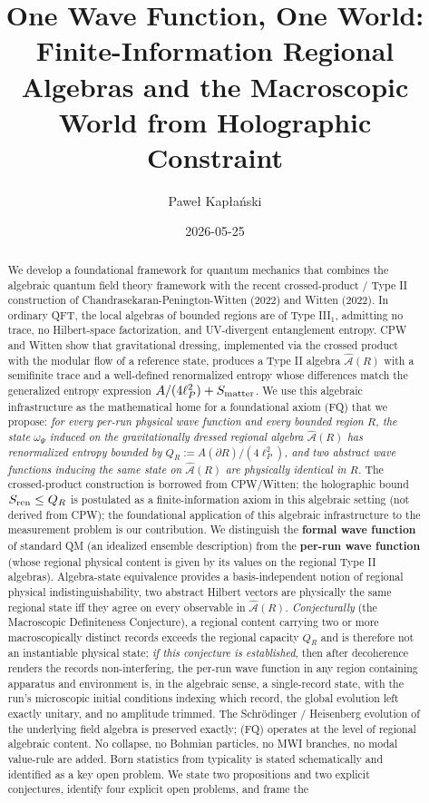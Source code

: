 \documentclass[11pt,a4paper]{article}
\title{One Wave Function, One World: Finite-Information Regional Algebras and the Macroscopic World from Holographic Constraint}
\author{Paweł Kapłański}
\date{2026-05-25}
\begin{document}
\maketitle

\begin{abstract}
\noindent We develop a foundational framework for quantum mechanics that combines the algebraic quantum field theory framework with the recent crossed-product / Type II construction of Chandrasekaran-Penington-Witten (2022) and Witten (2022). In ordinary QFT, the local algebras of bounded regions are of Type III$_1$, admitting no trace, no Hilbert-space factorization, and UV-divergent entanglement entropy. CPW and Witten show that gravitational dressing, implemented via the crossed product with the modular flow of a reference state, produces a Type II algebra $\hat{\mathcal{A}}(R)$ with a semifinite trace and a well-defined renormalized entropy whose differences match the generalized entropy expression $A/(4\ell_P^2) + S_{\rm matter}$. We use this algebraic infrastructure as the mathematical home for a foundational axiom (FQ) that we propose: \emph{for every per-run physical wave function and every bounded region $R$, the state $\omega_\Psi$ induced on the gravitationally dressed regional algebra $\hat{\mathcal{A}}(R)$ has renormalized entropy bounded by $Q_R := A(\partial R)/(4\ell_P^2)$, and two abstract wave functions inducing the same state on $\hat{\mathcal{A}}(R)$ are physically identical in $R$.} The crossed-product construction is borrowed from CPW/Witten; the holographic bound $S_{\rm ren} \le Q_R$ is postulated as a finite-information axiom in this algebraic setting (not derived from CPW); the foundational application of this algebraic infrastructure to the measurement problem is our contribution. We distinguish the \textbf{formal wave function} of standard QM (an idealized ensemble description) from the \textbf{per-run wave function} (whose regional physical content is given by its values on the regional Type II algebras). Algebra-state equivalence provides a basis-independent notion of regional physical indistinguishability, two abstract Hilbert vectors are physically the same regional state iff they agree on every observable in $\hat{\mathcal{A}}(R)$. \emph{Conjecturally} (the Macroscopic Definiteness Conjecture), a regional content carrying two or more macroscopically distinct records exceeds the regional capacity $Q_R$ and is therefore not an instantiable physical state; \emph{if this conjecture is established}, then after decoherence renders the records non-interfering, the per-run wave function in any region containing apparatus and environment is, in the algebraic sense, a single-record state, with the run's microscopic initial conditions indexing which record, the global evolution left exactly unitary, and no amplitude trimmed. The Schrödinger / Heisenberg evolution of the underlying field algebra is preserved exactly; (FQ) operates at the level of regional algebraic content. No collapse, no Bohmian particles, no MWI branches, no modal value-rule are added. Born statistics from typicality is stated schematically and identified as a key open problem. We state two propositions and two explicit conjectures, identify four explicit open problems, and frame the 
\end{abstract}
\end{document}
